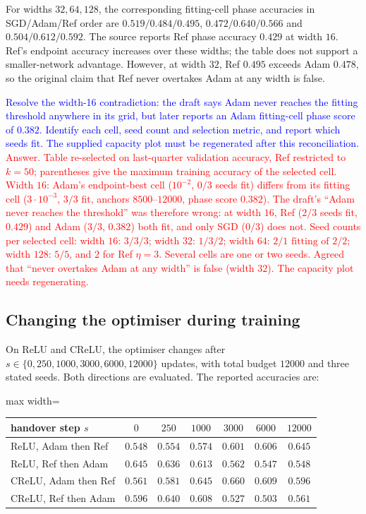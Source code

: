 \documentclass{article}
\newcommand{\zied}[1]{\textcolor{blue}{#1}}
\newcommand{\nat}[1]{\textcolor{red}{#1}}
\theoremstyle{definition}
\theoremstyle{remark}
\begin{document}
For widths $32,64,128$, the corresponding fitting-cell phase accuracies in SGD/Adam/Ref order are $0.519/0.484/0.495$, $0.472/0.640/0.566$ and $0.504/0.612/0.592$. The source reports Ref phase accuracy $0.429$ at width $16$. Ref's endpoint accuracy increases over these widths; the table does not support a smaller-network advantage. However, at width $32$, Ref $0.495$ exceeds Adam $0.478$, so the original claim that Ref never overtakes Adam at any width is false.

\zied{Resolve the width-16 contradiction: the draft says Adam never reaches the fitting threshold anywhere in its grid, but later reports an Adam fitting-cell phase score of $0.382$. Identify each cell, seed count and selection metric, and report which seeds fit. The supplied capacity plot must be regenerated after this reconciliation.}
\nat{Answer. Table re-selected on last-quarter validation accuracy, Ref restricted to $k=50$; parentheses give the maximum training accuracy of the selected cell. Width $16$: Adam's endpoint-best cell ($10^{-2}$, $0/3$ seeds fit) differs from its fitting cell ($3\cdot10^{-3}$, $3/3$ fit, anchors $8500$--$12000$, phase score $0.382$). The draft's ``Adam never reaches the threshold'' was therefore wrong: at width $16$, Ref ($2/3$ seeds fit, $0.429$) and Adam ($3/3$, $0.382$) both fit, and only SGD ($0/3$) does not. Seed counts per selected cell: width $16$: $3/3/3$; width $32$: $1/3/2$; width $64$: $2/1\text{ fitting of }2/2$; width $128$: $5/5$, and $2$ for Ref $\eta=3$. Several cells are one or two seeds. Agreed that ``never overtakes Adam at any width'' is false (width $32$). The capacity plot needs regenerating.}

\subsection{Changing the optimiser during training}\label{app:e13}

On ReLU and CReLU, the optimiser changes after $s\in\{0,250,1000,3000,6000,12000\}$ updates, with total budget $12000$ and three stated seeds. Both directions are evaluated. The reported accuracies are:

\begin{center}\small
\begin{adjustbox}{max width=\linewidth}
\begin{tabular}{lcccccc}
\toprule
handover step $s$ & $0$ & $250$ & $1000$ & $3000$ & $6000$ & $12000$ \\
\midrule
ReLU, Adam then Ref  & $0.548$ & $0.554$ & $0.574$ & $0.601$ & $0.606$ & $0.645$ \\
ReLU, Ref then Adam  & $0.645$ & $0.636$ & $0.613$ & $0.562$ & $0.547$ & $0.548$ \\
\midrule
CReLU, Adam then Ref & $0.561$ & $0.581$ & $0.645$ & $\mathbf{0.660}$ & $0.609$ & $0.596$ \\
CReLU, Ref then Adam & $0.596$ & $0.640$ & $0.608$ & $0.527$ & $0.503$ & $0.561$ \\
\bottomrule
\end{tabular}
\end{adjustbox}
\end{center}
\end{document}

